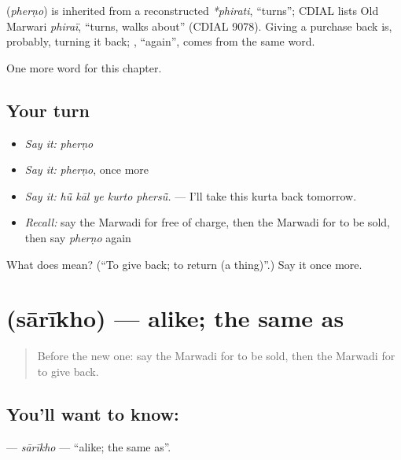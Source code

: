 \begin{cousinweb}
\textbf{} (\emph{pherṇo}) is inherited from a reconstructed \emph{*phirati}, \textquotedblleft{}turns\textquotedblright{}; CDIAL lists Old Marwari \emph{phiraï}, \textquotedblleft{}turns, walks about\textquotedblright{} (CDIAL 9078). Giving a purchase back is, probably, turning it back; \textbf{}, \textquotedblleft{}again\textquotedblright{}, comes from the same word.
\end{cousinweb}

\begin{grammarlens}[title={What you've built}]
One more word for this chapter.
\end{grammarlens}

\subsection*{Your turn}
\begin{itemize}
\raggedright
  \item \emph{Say it:} \emph{pherṇo}
  \item \emph{Say it:} \emph{pherṇo}, once more
  \item \emph{Say it:} \emph{hū̃ kāl ye kurto phersū̃.} — I'll take this kurta back tomorrow.
  \item \emph{Recall:} say the Marwadi for free of charge, then the Marwadi for to be sold, then say \emph{pherṇo} again
\end{itemize}

\begin{tcolorbox}[breakable,colback=teal!4,colframe=teal!35!black,title={Before you move on}]
What does  mean? (\textquotedblleft{}To give back; to return (a thing)\textquotedblright{}.) Say it once more.
\end{tcolorbox}
\section[\texorpdfstring{\mw{सारीखो} (sārīkho)}{सारीखो (sārīkho)}]{ (sārīkho) — alike; the same as}

\label{lesson:MW-C214-sarikho}



\begin{quote}
Before the new one: say the Marwadi for to be sold, then the Marwadi for to give back.
\end{quote}

\subsection*{You'll want to know: }
\textbf{} — \emph{sārīkho} — \textquotedblleft{}alike; the same as\textquotedblright{}.

